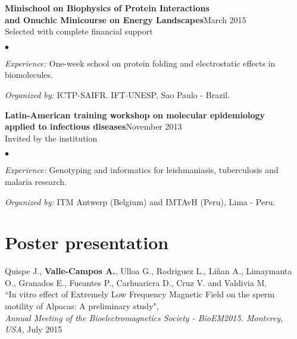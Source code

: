 \documentclass[margin,line]{res}
\newenvironment{list2}{
  \begin{list}{$\bullet$}{%
      \setlength{\itemsep}{0in}
      \setlength{\parsep}{0in} \setlength{\parskip}{0in}
      \setlength{\topsep}{0in} \setlength{\partopsep}{0in}
      \setlength{\leftmargin}{0.2in}}}{\end{list}}
\begin{document}
\begin{resume}
{\bf Minischool on Biophysics of Protein Interactions \\and Onuchic Minicourse on Energy Landscapes}\hfill {March 2015}\\
Selected with complete financial support
\begin{list2} %
	\item \textit{Experience:} One-week school on protein folding and electrostatic effects in biomolecules.
	\item \textit{Organized by:} ICTP-SAIFR. IFT-UNESP, Sao Paulo - Brazil.
\end{list2}

{\bf Latin-American training workshop on molecular epidemiology \\applied to infectious diseases}\hfill {November 2013}\\
Invited by the institution
\begin{list2} %
	\item \textit{Experience:} Genotyping and informatics for leishmaniasis, tuberculosis and malaria research.
	\item \textit{Organized by:} ITM Antwerp (Belgium) and IMTAvH (Peru), Lima - Peru.\\
\end{list2}



\section{\sc Poster presentation}

Quispe J., \textbf{Valle-Campos A.}, Ulloa G., Rodriguez L., Liñan A., Limaymanta O., Granados E., Fueantes P., Carhuaricra D., Cruz V. and Valdivia M.\\ ``In vitro effect of Extremely Low Frequency Magnetic Field on the sperm motility of Alpacas: A preliminary study", \\ {\em Annual Meeting of the Bioelectromagnetics Society - BioEM2015. Monterey, USA}, July 2015\\







\end{resume}
\end{document}
